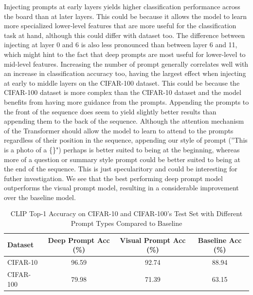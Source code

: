 \documentclass[a4paper]{article}
\begin{document}
Injecting prompts at early layers yields higher classification performance across the board than at later layers. This could be because it allows the model to learn more specialized lower-level
features that are more useful for the classification task at hand, although this could differ with dataset too. The
difference between injecting at layer 0 and 6 is also less pronounced than between layer 6 and 11, which might hint to
the fact that deep prompts are most useful for lower-level to mid-level features.
\newline \newline
Increasing the number of prompt generally correlates well with an increase in classification accuracy too, having
the largest effect when injecting at early to middle layers on the CIFAR-100 dataset. This could be because the
CIFAR-100 dataset is more complex than the CIFAR-10 dataset and the model benefits from having more guidance from the
prompts.
\newline \newline
Appending the prompts to the front of the sequence does seem to yield
slightly better results than appending them to the back of the sequence. Although the attention mechanism of the
Transformer should allow the model to learn to attend to the prompts regardless of their position in the sequence,
appending our style of prompt (''This is a photo of a \{\}") perhaps is better suited to being at the beginning,
whereas more of a question or summary style prompt could be better suited to being at the end of the sequence. This
is just specularitory and could be interesting for futher investigation.
\newline \newline
We see that the best performing deep prompt model outperforms the visual prompt model, resulting in a considerable
improvement over the baseline model. 
\begin{table}[h]
    \centering
    \begin{tabular}{|l|c|c|c|}
    \hline
    \rowcolor{Gray}
    \textbf{Dataset} & \textbf{Deep Prompt Acc (\%)} & \textbf{Visual Prompt Acc (\%)} & \textbf{Baseline Acc (\%)} \\ \hline
    CIFAR-10 & 96.59 & 92.74 & 88.94 \\ \hline
    CIFAR-100 & 79.98 & 71.39 & 63.15 \\ \hline
    \end{tabular}
    \caption{CLIP Top-1 Accuracy on CIFAR-10 and CIFAR-100's Test Set with Different Prompt Types Compared to Baseline}
    \label{tab:clip_accuracy}
\end{table}
\end{document}
